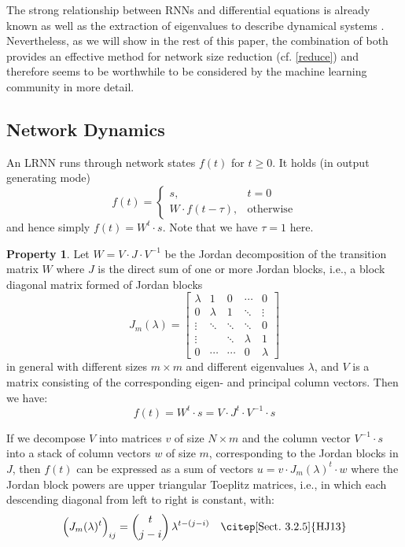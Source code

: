 \documentclass[twoside,11pt]{article}
\theoremstyle{definition}
\newtheorem{prop}{Property}
\begin{document}
The strong relationship between RNNs and differential equations is already known
\citep[Sect.~9]{KB+16} as well as the extraction of eigenvalues to describe
dynamical systems \citep[Sect.~5]{Str15}. Nevertheless, as we will show in the
rest of this paper, the combination of both provides an effective method for
network size reduction (cf. \cref{reduce}) and therefore seems to be worthwhile
to be considered by the machine learning community in more detail.

\subsection{Network Dynamics}\label{dynamics}

An LRNN runs through network states $f(t)$ for $t
\ge 0$. It holds (in output generating mode)
\[ f(t) = \left\{ \begin{array}{ll}
	s, & t=0\\
	W \cdot f(t-\tau), & \text{otherwise}
\end{array} \right. \]
and hence simply $f(t) = W^t \cdot s$. Note that we have $\tau = 1$ here.

\begin{prop}\label{jordan}
Let $W = V \cdot J \cdot V^{-1}$ be the Jordan decomposition of the transition
matrix $W$ where $J$ is the direct sum of one or more Jordan blocks, i.e., a
block diagonal matrix formed of Jordan blocks
\[ J_m(\lambda) = \left[ \begin{array}{*{5}{c}}
  \lambda & 1 & 0 & \cdots & 0\\
  0 & \lambda & 1 & \ddots & \vdots\\
  \vdots & \ddots & \ddots & \ddots & 0\\
  \vdots & & \ddots & \lambda & 1\\
  0 & \cdots & \cdots & 0 & \lambda
\end{array} \right] \]
in general with different sizes $m \times m$ and different eigenvalues $\lambda$,
and $V$ is a matrix consisting of the corresponding eigen- and principal column vectors.
Then we have: \[ f(t) = W^t \cdot s = V \cdot J^t \cdot V^{-1} \cdot s \]

If we decompose $V$ into matrices $v$ of size $N \times m$ and the column vector
$V^{-1} \cdot s$ into a stack of column vectors $w$ of size $m$, corresponding
to the Jordan blocks in $J$, then $f(t)$ can be expressed as a sum of vectors $u
= v \cdot J_m(\lambda)^t \cdot w$ where the Jordan block powers are upper
triangular Toeplitz matrices, i.e., in which each descending diagonal from left
to right is constant, with:
\begin{equation}\label{power}
  \Big( J_m(\lambda)^t \Big)_{ij} = \binom{t}{j-i}\,\lambda^{t-(j-i)}
	\quad\text{\citep[Sect.~3.2.5]{HJ13}}
\end{equation}
\end{prop}
\end{document}
